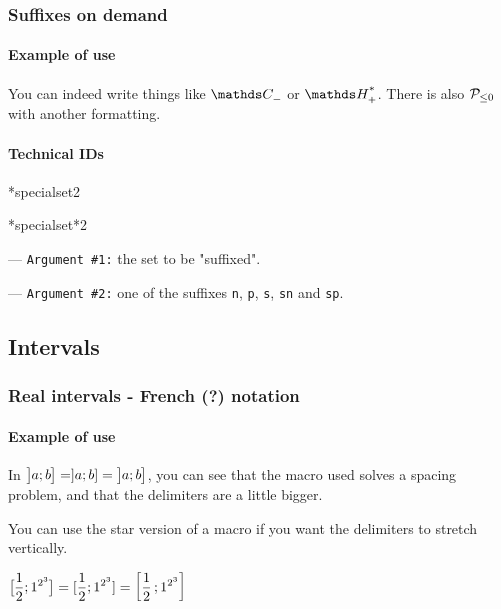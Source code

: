 \documentclass[12pt,a4paper]{article}
\makeatletter
\newcommand\IDmacro{\@ifstar{\@IDmacroStar}{\@IDmacroNoStar}}
\newcommand\@IDmacroNoStar[3]{%
        \texttt{%
        	\textbackslash#1%
        	\IfStrEq{#2}{0}{}{%
        		\,\,[#2 Option%
				\IfStrEq{#2}{1}{}{s}]%
			}%
    	    \,\,(#3 Argument%
				\IfStrEq{#3}{1}{}{s})%
	   	}
        \immediate\write\tempfile{macro@#1@#2@#3}%
    }
\newcommand\@IDmacroStar[2]{%
        \@IDmacroNoStar{#1}{0}{#2}%
    }
\newcommand\@IDoptarg[2]{%
    	\vspace{0.5em}
		--- \texttt{#1 \##2:}%
	}
\newcommand\IDarg[1]{%
    	\@IDoptarg{Argument}{#1}%
	}
\makeatother
\begin{document}
    \subsubsection{Suffixes on demand}

		\paragraph{Example of use}

\begin{tcblisting}{}
You can indeed write things like $\specialset{\CC}{n}$ or $\specialset{\HH}{sp}$. 
There is also $\specialset*{\probaset{P}}{n}$ with another formatting.
\end{tcblisting}


		\paragraph{Technical IDs}

\IDmacro*{specialset}{2}

\IDmacro*{specialset*}{2}

\IDarg{1} the set to be "suffixed".

\IDarg{2} one of the suffixes \verb+n+, \verb+p+, \verb+s+, \verb+sn+ and \verb+sp+.




\subsection{Intervals}

    \subsubsection{Real intervals - French (?) notation}

		\paragraph{Example of use}

\begin{tcblisting}{}
In $\intervalOC{a}{b} = ]a ; b] = \intervalOC{a}{b}$, you can see that the macro
used solves a spacing problem, and that the delimiters are a little bigger.


\medskip

You can use the star version of a macro if you want the delimiters to stretch 
vertically.

$\displaystyle \intervalC{ \frac{1}{2} }{ 1^{2^{3}} }
             = [ \frac{1}{2} ; 1^{2^{3}} ] 
             = \intervalC*{ \frac{1}{2} }{ 1^{2^{3}} }$
\end{tcblisting}
\end{document}

